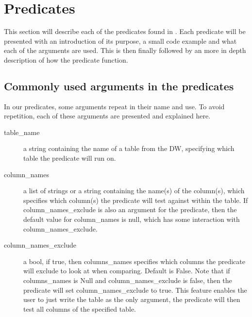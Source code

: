 \section{Predicates}
This section will describe each of the predicates found in \FW. Each predicate will be presented with an introduction of its purpose, a small code example and what each of the arguments are used. This is then finally followed by an more in depth description of how the predicate function.

\subsection{Commonly used arguments in the predicates}
In our predicates, some arguments repeat in their name and use. To avoid repetition, each of these arguments are presented and explained here.

\begin{description}
\item [table\_name] a string containing the name of a table from the DW, specifying which table the predicate will run on.
\item [column\_names] a list of strings or a string containing the name(s) of the column(s), which specifies which column(s) the predicate will test against within the table. If column\_names\_exclude is also an argument for the predicate, then the default value for column\_names is null, which has some interaction with column\_names\_exclude.
\item [column\_names\_exclude] a bool, if true, then columns\_names specifies which columns the predicate will exclude to look at when comparing. Default is False. Note that if columns\_names is Null and column\_names\_exclude is false, then the predicate will set column\_names\_exclude to true. This feature enables the user to just write the table as the only argument, the predicate will then test all columns of the specified table.
\end{description}








